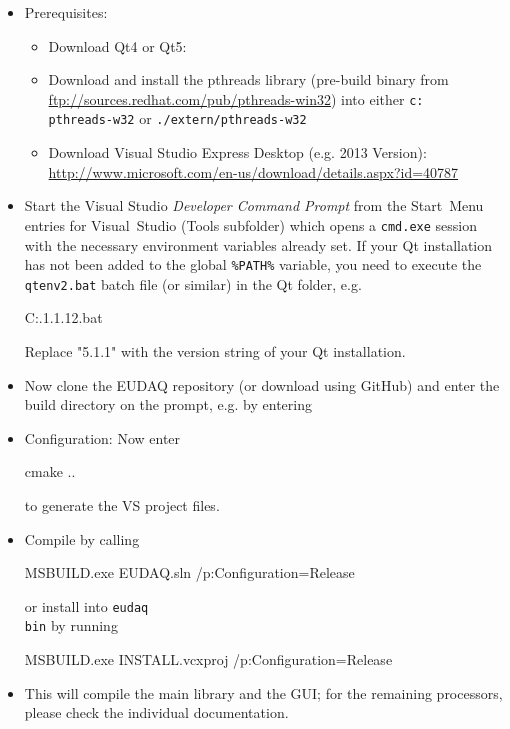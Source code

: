 \begin{itemize}
\item Prerequisites: 
\begin{itemize}
\item Download Qt4 or Qt5:
\item Download and install the pthreads library (pre-build binary from
  \url{ftp://sources.redhat.com/pub/pthreads-win32}) into either
  \texttt{c:\\pthreads-w32} or \texttt{./extern/pthreads-w32}
\item Download Visual Studio Express Desktop (e.g. 2013 Version):
  \url{http://www.microsoft.com/en-us/download/details.aspx?id=40787}
\end{itemize}

\item Start the Visual Studio \emph{Developer Command Prompt} from the
  Start~Menu entries for Visual~Studio (Tools subfolder) which opens a
  \texttt{cmd.exe} session with the necessary environment variables
  already set. If your Qt installation has not been added to the
  global \texttt{\%PATH\%} variable, you need to execute the \texttt{qtenv2.bat} batch file (or similar) in the Qt folder, e.g.
  
  \begin{listing}[mybash]
C:\Qt{}.1\5.1.1\bin\qtenv2.bat
\end{listing}
Replace "5.1.1" with the version string of your Qt installation.

\item Now clone the EUDAQ repository (or download using GitHub) and enter the build directory on the prompt, e.g. by entering

  \begin{listing}[mybash]
cd c:\Users\[username]\Documents\GitHub\eudaq\build
\end{listing}

\item Configuration: Now enter

  \begin{listing}[mybash]
cmake ..
\end{listing}

to generate the VS project files.

\item Compile by calling
  \begin{listing}[mybash]
MSBUILD.exe EUDAQ.sln /p:Configuration=Release
\end{listing}
or install into \texttt{eudaq\\bin} by running
  \begin{listing}[mybash]
MSBUILD.exe INSTALL.vcxproj /p:Configuration=Release
\end{listing}
\item This will compile the main library and the GUI; for the remaining processors, please check the individual documentation.
\end{itemize}

